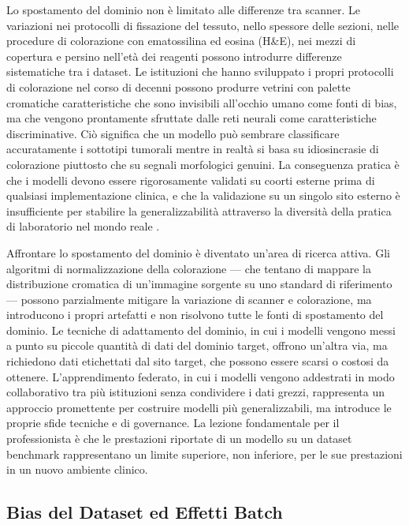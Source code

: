 Lo spostamento del dominio non è limitato alle differenze tra scanner. Le variazioni nei protocolli di fissazione del tessuto, nello spessore delle sezioni, nelle procedure di colorazione con ematossilina ed eosina (H\&E), nei mezzi di copertura e persino nell'età dei reagenti possono introdurre differenze sistematiche tra i dataset. Le istituzioni che hanno sviluppato i propri protocolli di colorazione nel corso di decenni possono produrre vetrini con palette cromatiche caratteristiche che sono invisibili all'occhio umano come fonti di bias, ma che vengono prontamente sfruttate dalle reti neurali come caratteristiche discriminative. Ciò significa che un modello può sembrare classificare accuratamente i sottotipi tumorali mentre in realtà si basa su idiosincrasie di colorazione piuttosto che su segnali morfologici genuini. La conseguenza pratica è che i modelli devono essere rigorosamente validati su coorti esterne prima di qualsiasi implementazione clinica, e che la validazione su un singolo sito esterno è insufficiente per stabilire la generalizzabilità attraverso la diversità della pratica di laboratorio nel mondo reale \cite{song2023}.

Affrontare lo spostamento del dominio è diventato un'area di ricerca attiva. Gli algoritmi di normalizzazione della colorazione — che tentano di mappare la distribuzione cromatica di un'immagine sorgente su uno standard di riferimento — possono parzialmente mitigare la variazione di scanner e colorazione, ma introducono i propri artefatti e non risolvono tutte le fonti di spostamento del dominio. Le tecniche di adattamento del dominio, in cui i modelli vengono messi a punto su piccole quantità di dati del dominio target, offrono un'altra via, ma richiedono dati etichettati dal sito target, che possono essere scarsi o costosi da ottenere. L'apprendimento federato, in cui i modelli vengono addestrati in modo collaborativo tra più istituzioni senza condividere i dati grezzi, rappresenta un approccio promettente per costruire modelli più generalizzabili, ma introduce le proprie sfide tecniche e di governance. La lezione fondamentale per il professionista è che le prestazioni riportate di un modello su un dataset benchmark rappresentano un limite superiore, non inferiore, per le sue prestazioni in un nuovo ambiente clinico.

\subsection{Bias del Dataset ed Effetti Batch}

